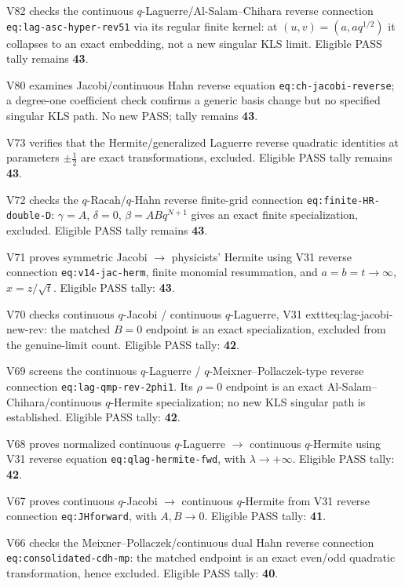 \documentclass[11pt]{article}
\begin{document}
\noindent V82 checks the continuous $q$-Laguerre/Al-Salam--Chihara reverse connection \texttt{eq:lag-asc-hyper-rev51} via its regular finite kernel: at $(u,v)=(a,aq^{1/2})$ it collapses to an exact embedding, not a new singular KLS limit. Eligible PASS tally remains \textbf{43}.\par
\noindent V80 examines Jacobi/continuous Hahn reverse equation \texttt{eq:ch-jacobi-reverse}; a degree-one coefficient check confirms a generic basis change but no specified singular KLS path. No new PASS; tally remains \textbf{43}.\par
\noindent V73 verifies that the Hermite/generalized Laguerre reverse quadratic identities at parameters $\pm\tfrac12$ are exact transformations, excluded. Eligible PASS tally remains \textbf{43}.\par
\noindent V72 checks the $q$-Racah/$q$-Hahn reverse finite-grid connection \texttt{eq:finite-HR-double-D}: $\gamma=A$, $\delta=0$, $\beta=ABq^{N+1}$ gives an exact finite specialization, excluded. Eligible PASS tally remains \textbf{43}.\par
\noindent V71 proves symmetric Jacobi $\to$ physicists' Hermite using V31 reverse connection \texttt{eq:v14-jac-herm}, finite monomial resummation, and $a=b=t\to\infty$, $x=z/\sqrt t$. Eligible PASS tally: \textbf{43}.\par
\noindent V70 checks continuous $q$-Jacobi / continuous $q$-Laguerre, V31 	exttt{eq:lag-jacobi-new-rev}: the matched $B=0$ endpoint is an exact specialization, excluded from the genuine-limit count. Eligible PASS tally: \textbf{42}.\par
\noindent V69 screens the continuous $q$-Laguerre / $q$-Meixner--Pollaczek-type reverse connection \texttt{eq:lag-qmp-rev-2phi1}. Its $\rho=0$ endpoint is an exact Al-Salam--Chihara/continuous $q$-Hermite specialization; no new KLS singular path is established. Eligible PASS tally: \textbf{42}.\par
\noindent V68 proves normalized continuous $q$-Laguerre $\to$ continuous $q$-Hermite using V31 reverse equation \texttt{eq:qlag-hermite-fwd}, with $\lambda\to+\infty$. Eligible PASS tally: \textbf{42}.\par
\noindent V67 proves continuous $q$-Jacobi $\to$ continuous $q$-Hermite from V31 reverse connection \texttt{eq:JHforward}, with $A,B\to0$. Eligible PASS tally: \textbf{41}.\par
\noindent V66 checks the Meixner--Pollaczek/continuous dual Hahn reverse connection \texttt{eq:consolidated-cdh-mp}: the matched endpoint is an exact even/odd quadratic transformation, hence excluded. Eligible PASS tally: \textbf{40}.\par
\end{document}
